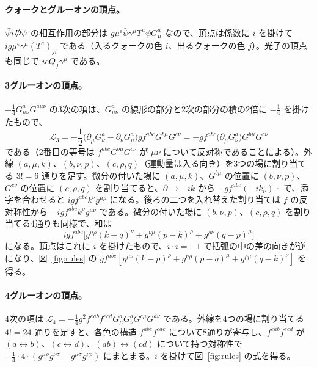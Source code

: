 \documentclass[a4paper,10pt]{ltjsarticle}
\begin{document}
\paragraph{クォークとグルーオンの頂点。}$\bar\psi i\slashed D\psi$ の相互作用の部分は $g\mu^\epsilon\bar\psi\gamma^\mu T^a\psi G^a_\mu$ なので、頂点は係数に $i$ を掛けて $ig\mu^\epsilon\gamma^\mu(T^a)_{ji}$ である（入るクォークの色 $i$、出るクォークの色 $j$）。光子の頂点も同じで $ieQ_f\gamma^\mu$ である。

\paragraph{3グルーオンの頂点。}$-\frac14G^a_{\mu\nu}G^{a\mu\nu}$ の3次の項は、$G^a_{\mu\nu}$ の線形の部分と2次の部分の積の2倍に $-\frac14$ を掛けたもので、
\begin{equation*}
\mathcal L_3=-\frac12\bigl(\partial_\mu G^a_\nu-\partial_\nu G^a_\mu\bigr)g f^{abc}G^{b\mu}G^{c\nu}=-gf^{abc}\bigl(\partial_\mu G^a_\nu\bigr)G^{b\mu}G^{c\nu}
\end{equation*}
である（2番目の等号は $f^{abc}G^{b\mu}G^{c\nu}$ が $\mu\nu$ について反対称であることによる）。外線 $(a,\mu,k)$、$(b,\nu,p)$、$(c,\rho,q)$（運動量は入る向き）を3つの場に割り当てる $3!=6$ 通りを足す。微分の付いた場に $(a,\mu,k)$、$G^{b\mu}$ の位置に $(b,\nu,p)$、$G^{c\nu}$ の位置に $(c,\rho,q)$ を割り当てると、$\partial\to-ik$ から $-gf^{abc}(-ik_\nu)\,\cdot$ で、添字を合わせると $igf^{abc}k^\nu g^{\mu\rho}$ になる。後ろの二つを入れ替えた割り当ては $f$ の反対称性から $-igf^{abc}k^\rho g^{\mu\nu}$ である。微分の付いた場に $(b,\nu,p)$、$(c,\rho,q)$ を割り当てる4通りも同様で、和は
\begin{equation*}
igf^{abc}\bigl[g^{\mu\rho}(k-q)^\nu+g^{\nu\mu}(p-k)^\rho+g^{\rho\nu}(q-p)^\mu\bigr]
\end{equation*}
になる。頂点はこれに $i$ を掛けたもので、$i\cdot i=-1$ で括弧の中の差の向きが逆になり、図~\ref{fig:rules} の $gf^{abc}[g^{\mu\nu}(k-p)^\rho+g^{\nu\rho}(p-q)^\mu+g^{\rho\mu}(q-k)^\nu]$ を得る。

\paragraph{4グルーオンの頂点。}4次の項は $\mathcal L_4=-\frac14g^2f^{eab}f^{ecd}G^a_\mu G^b_\nu G^{c\mu}G^{d\nu}$ である。外線を4つの場に割り当てる $4!=24$ 通りを足すと、各色の構造 $f^{abe}f^{cde}$ について8通りが寄与し、$f^{eab}f^{ecd}$ が $(a\leftrightarrow b)$、$(c\leftrightarrow d)$、$(ab)\leftrightarrow(cd)$ について持つ対称性で $-\frac14\cdot4\cdot(g^{\mu\rho}g^{\nu\sigma}-g^{\mu\sigma}g^{\nu\rho})$ にまとまる。$i$ を掛けて図~\ref{fig:rules} の式を得る。
\end{document}
